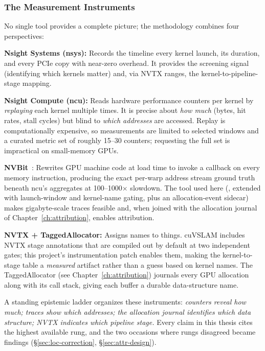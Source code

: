 \subsubsection{The Measurement Instruments}\label{sec:bg-tools}

No single tool provides a complete picture; the methodology combines four perspectives:

\textbf{Nsight Systems (nsys):} Records the timeline every kernel launch, its duration, and every PCIe copy with near-zero overhead. It provides the screening signal (identifying which kernels matter) and, via NVTX ranges, the kernel-to-pipeline-stage mapping.

\textbf{Nsight Compute (ncu):} Reads hardware performance counters per kernel by \emph{replaying} each kernel multiple times. It is precise about \emph{how much} (bytes, hit rates, stall cycles) but blind to \emph{which addresses} are accessed. Replay is computationally expensive, so measurements are limited to selected windows and a curated metric set of roughly 15--30 counters; requesting the full set is impractical on small-memory GPUs.

\textbf{NVBit}~\cite{villa2019nvbit}: Rewrites GPU machine code at load time to invoke a callback on every memory instruction, producing the exact per-warp address stream ground truth beneath ncu's aggregates at 100--1000$\times$ slowdown. The tool used here (, extended with launch-window and kernel-name gating, plus an allocation-event sidecar) makes gigabyte-scale traces feasible and, when joined with the allocation journal of Chapter~\ref{ch:attribution}, enables attribution.

\textbf{NVTX + TaggedAllocator:} Assigns names to things. cuVSLAM includes NVTX stage annotations that are compiled out by default at two independent gates; this project's instrumentation patch enables them, making the kernel-to-stage table a \emph{measured} artifact rather than a guess based on kernel names. The TaggedAllocator (see Chapter~\ref{ch:attribution}) journals every GPU allocation along with its call stack, giving each buffer a durable data-structure name.

A standing epistemic ladder organizes these instruments: \emph{counters reveal how much; traces show which addresses; the allocation journal identifies which data structure; NVTX indicates which pipeline stage.} Every claim in this thesis cites the highest available rung, and the two occasions where rungs disagreed became findings (\S\ref{sec:loc-correction}, \S\ref{sec:attr-design}).

